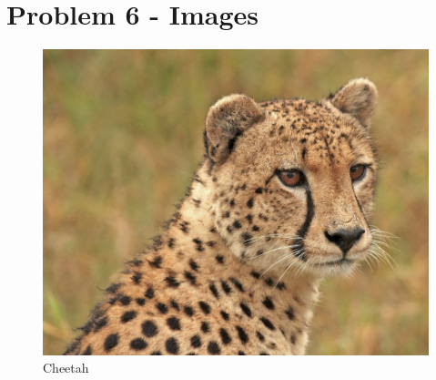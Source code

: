 \documentclass[12pt]{article}
\begin{document}
\section*{Problem 6 - Images}

\begin{figure}
\begin{center}
        \includegraphics[scale=0.2]{cheetah.jpg}
\end{center}
\caption{\label{figcaption} Cheetah}
\end{figure}
\end{document}

